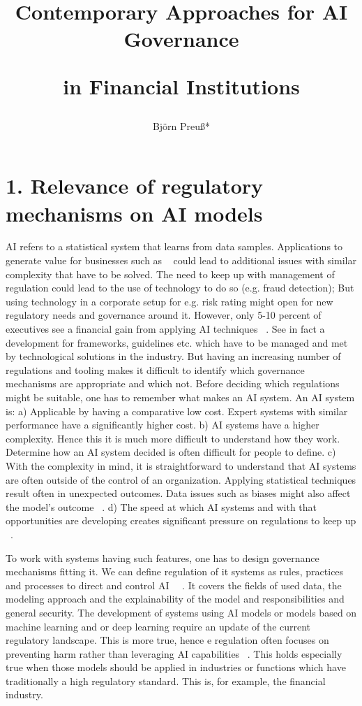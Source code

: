 \documentclass[jou,apacite]{apa6}
\title{Contemporary Approaches for AI Governance \par in Financial Institutions}
\author{Björn Preuß*}
\affiliation{*Copenhagen Business School, Department of Economics, Government and Business\par
*Copenhagen Business School, Center of Corporate Governance}
\begin{document}
\maketitle    
                        
\section{1. Relevance of regulatory mechanisms on AI models}

AI refers to a statistical system that learns from data samples. Applications to generate value for businesses such as ~\cite{jiang2019prediction} could lead to additional issues with similar complexity that have to be solved.
The need to keep up with management of regulation could lead to the use of technology to do so (e.g. fraud detection); But using technology in a corporate setup for e.g. risk rating might open for new regulatory needs and governance around it. However, only 5-10 percent of executives see a financial gain from applying AI techniques ~\cite{ransbotham2019winning}. See in fact a development for frameworks, guidelines etc. which have to be managed and met by technological solutions in the industry. But having an increasing number of regulations and tooling makes it difficult to identify which governance mechanisms are appropriate and which not. Before deciding which regulations might be suitable, one has to remember what makes an AI system. An AI system is: a) Applicable by having a comparative low cost. Expert systems with similar performance have a significantly higher cost. b) AI systems have a higher complexity. Hence this it is much more difficult to understand how they work. Determine how an AI system decided is often difficult for people to define. c) With the complexity in mind, it is straightforward to understand that AI systems are often outside of the control of an organization. Applying statistical techniques result often in unexpected outcomes. Data issues such as biases might also affect the model’s outcome ~\cite{morgulis2019fooling}. d) The speed at which AI systems and with that opportunities are developing creates significant pressure on regulations to keep up ~\cite{cihon2019standards}.\par

To work with systems having such features, one has to design governance mechanisms fitting it. We can define regulation of it systems as rules, practices and processes to direct and control AI ~\cite{almeida2020artificial}~\cite{winfield2019machine}. It covers the fields of used data, the modeling approach and the explainability of the model and responsibilities and general security. The development of systems using AI models or models based on machine learning and or deep learning require an update of the current regulatory landscape. This is more true, hence e regulation often focuses on preventing harm rather than leveraging AI capabilities ~\cite{winfield2019machine}. This holds especially true when those models should be applied in industries or functions which have traditionally a high regulatory standard. This is, for example, the financial industry.\par
 
\end{document}
